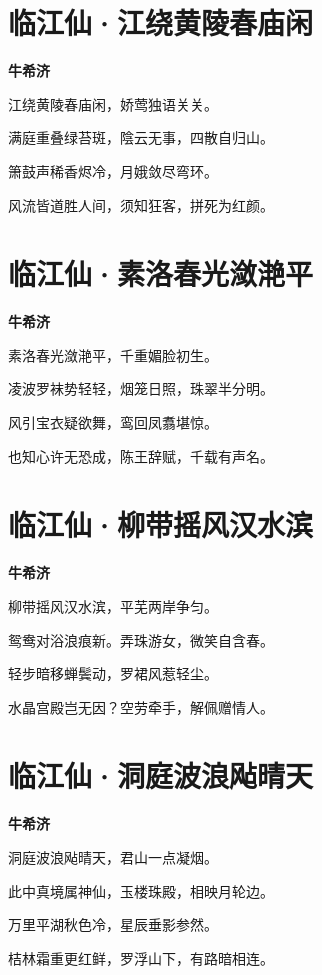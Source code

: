 \documentclass[12pt,a4paper]{ctexbook}
\begin{document}
\section{临江仙·江绕黄陵春庙闲}
\textbf{牛希济}\par\vspace{0.5em}
江绕黄陵春庙闲，娇莺独语关关。\par
满庭重叠绿苔斑，陰云无事，四散自归山。\par
箫鼓声稀香烬冷，月娥敛尽弯环。\par
风流皆道胜人间，须知狂客，拼死为红颜。\par

\section{临江仙·素洛春光潋滟平}
\textbf{牛希济}\par\vspace{0.5em}
素洛春光潋滟平，千重媚脸初生。\par
凌波罗袜势轻轻，烟笼日照，珠翠半分明。\par
风引宝衣疑欲舞，鸾回凤翥堪惊。\par
也知心许无恐成，陈王辞赋，千载有声名。\par

\section{临江仙·柳带摇风汉水滨}
\textbf{牛希济}\par\vspace{0.5em}
柳带摇风汉水滨，平芜两岸争匀。\par
鸳鸯对浴浪痕新。弄珠游女，微笑自含春。\par
轻步暗移蝉鬓动，罗裙风惹轻尘。\par
水晶宫殿岂无因？空劳牵手，解佩赠情人。\par

\section{临江仙·洞庭波浪飐晴天}
\textbf{牛希济}\par\vspace{0.5em}
洞庭波浪飐晴天，君山一点凝烟。\par
此中真境属神仙，玉楼珠殿，相映月轮边。\par
万里平湖秋色冷，星辰垂影参然。\par
桔林霜重更红鲜，罗浮山下，有路暗相连。\par
\end{document}
